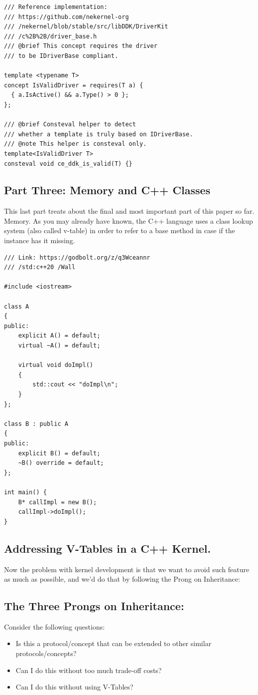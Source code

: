 \documentclass{article}
\begin{document}
{{\begin{lstlisting}
/// Reference implementation:
/// https://github.com/nekernel-org
/// /nekernel/blob/stable/src/libDDK/DriverKit
/// /c%2B%2B/driver_base.h
/// @brief This concept requires the driver 
/// to be IDriverBase compliant.

template <typename T>
concept IsValidDriver = requires(T a) {
  { a.IsActive() && a.Type() > 0 };
};

/// @brief Consteval helper to detect
/// whether a template is truly based on IDriverBase.
/// @note This helper is consteval only.
template<IsValidDriver T>
consteval void ce_ddk_is_valid(T) {}
\end{lstlisting}
}
}

\subsection{Part Three: Memory and C++ Classes}
{
This last part treats about the final and most important part of this paper so far. Memory. As you may already have known, the C++ language uses a class lookup system (also called v-table) in order to refer to a base method in case if the instance has it missing.

\begin{lstlisting}
/// Link: https://godbolt.org/z/q3Wceannr
/// /std:c++20 /Wall

#include <iostream>

class A
{
public:
    explicit A() = default;
    virtual ~A() = default;

    virtual void doImpl() 
    {
        std::cout << "doImpl\n";
    }
};

class B : public A
{
public:
    explicit B() = default;
    ~B() override = default;
};

int main() {
    B* callImpl = new B();
    callImpl->doImpl();
}
\end{lstlisting}

\subsection{Addressing V-Tables in a C++ Kernel.}

Now the problem with kernel development is that we want to avoid such feature as much as possible, and we'd do that by following the Prong on Inheritance:

\subsection{The Three Prongs on Inheritance:}

Consider the following questions:

\begin{itemize}
\item[A:] Is this a protocol/concept that can be extended to other similar protocols/concepts?
\item[B:] Can I do this without too much trade-off costs?
\item[C:] Can I do this without using V-Tables?
\end{itemize}
}
\end{document}

